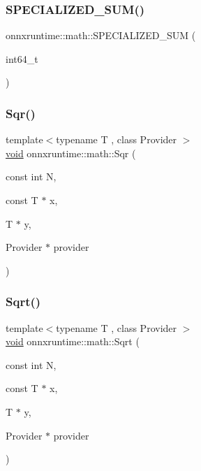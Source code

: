 \mbox{\label{namespaceonnxruntime_1_1math_a30e0fe3ea70473a15869776e474e0271}} 
\subsubsection{\texorpdfstring{S\+P\+E\+C\+I\+A\+L\+I\+Z\+E\+D\+\_\+\+S\+U\+M()}{SPECIALIZED\_SUM()}\hspace{0.1cm}{\footnotesize\ttfamily [3/3]}}
{\footnotesize\ttfamily onnxruntime\+::math\+::\+S\+P\+E\+C\+I\+A\+L\+I\+Z\+E\+D\+\_\+\+S\+UM (\begin{DoxyParamCaption}\item[{int64\+\_\+t}]{ }\end{DoxyParamCaption})}

\mbox{\label{namespaceonnxruntime_1_1math_a91dbfd47e8a79e041fbf4fe56738a0d6}} 
\subsubsection{\texorpdfstring{Sqr()}{Sqr()}}
{\footnotesize\ttfamily template$<$typename T , class Provider $>$ \\
\mbox{\hyperlink{mlasi_8h_a88f941d423cb2a819b70a1358982b1a6}{void}} onnxruntime\+::math\+::\+Sqr (\begin{DoxyParamCaption}\item[{const int}]{N,  }\item[{const T $\ast$}]{x,  }\item[{T $\ast$}]{y,  }\item[{Provider $\ast$}]{provider }\end{DoxyParamCaption})}

\mbox{\label{namespaceonnxruntime_1_1math_abadd1cdbc69d0aed1bf8a188dac24759}} 
\subsubsection{\texorpdfstring{Sqrt()}{Sqrt()}}
{\footnotesize\ttfamily template$<$typename T , class Provider $>$ \\
\mbox{\hyperlink{mlasi_8h_a88f941d423cb2a819b70a1358982b1a6}{void}} onnxruntime\+::math\+::\+Sqrt (\begin{DoxyParamCaption}\item[{const int}]{N,  }\item[{const T $\ast$}]{x,  }\item[{T $\ast$}]{y,  }\item[{Provider $\ast$}]{provider }\end{DoxyParamCaption})}

